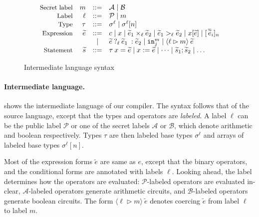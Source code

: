 \begin{figure}
  \small
  \[
  \begin{array}{rrcl}
    \text{\small{Secret label}} & m &::=& \mathcal{A} \mid \mathcal{B}\\
    \text{\small{Label}} & \ell &::=& \mathcal{P} \mid m\\
    \text{\small{Type}} & \tau &::=& \sigma^{\ell} \mid \sigma^{\ell}[n]\\
    \text{\small{Expression}} & \widetilde{e} &::=& c \mid x \mid \widetilde{e}_{1} \times_{\ell} \widetilde{e}_{2} \mid \widetilde{e}_{1} >_{\ell} \widetilde{e}_{2} \mid x[\widetilde{e}] \mid [\,\overline{\widetilde{e}}_{i}]_{n} \\
    & & \mid & {{{\widetilde{e}}}\:?_{{\ell}}\:{{\widetilde{e}}_{1}}\::{{\widetilde{e}}_{2}}} \mid {\ensuremath{\mathtt{in}}}^{m}_{j} \mid \langle \ell \rhd m \rangle\:\widetilde{e}\\
    \text{\small{Statement}} & \widetilde{s} &::=& \tau\:x = \widetilde{e} \mid x := \widetilde{e} \mid \dots \mid \widetilde{s}_{1}; \widetilde{s}_{2} \mid \dots\\
  \end{array}
  \]
\caption{Intermediate language syntax}
\label{fig:interlang}
\end{figure}

\paragraph{Intermediate language.}  shows the
intermediate language of our compiler. The syntax follows that of the source
language, except that the types and operators are \emph{labeled}. 
A label $\ell$ can be the  public label $\mathcal{P}$ or  one of the secret labels $\mathcal{A}$ or
$\mathcal{B}$, which denote arithmetic and boolean respectively.
Types $\tau$ are then
labeled base types $\sigma^{\ell}$ and arrays of labeled base types
$\sigma^{\ell}[n]$.

Most of the expression forms $\widetilde{e}$ are same as $e$, except
that the binary operators, and the conditional forms
are annotated with labels $\ell$.
Looking ahead, the label determines how the operators are
evaluated: $\mathcal{P}$-labeled operators are evaluated in-clear, $\mathcal{A}$-labeled operators generate arithmetic circuits, and
$\mathcal{B}$-labeled operators generate boolean circuits. The
form $\langle \ell \rhd m \rangle\:\widetilde{e}$ denotes coercing
$\widetilde{e}$ from label $\ell$ to label $m$.



